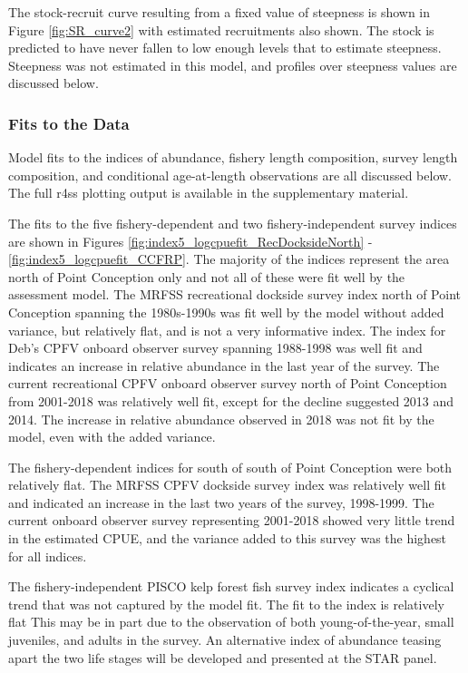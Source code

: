 \documentclass[12pt,]{article}
\begin{document}
The stock-recruit curve resulting from a fixed value of steepness is
shown in Figure \ref{fig:SR_curve2} with estimated recruitments also
shown. The stock is predicted to have never fallen to low enough levels
that to estimate steepness. Steepness was not estimated in this model,
and profiles over steepness values are discussed below.

\subsubsection{Fits to the Data}\label{fits-to-the-data}

Model fits to the indices of abundance, fishery length composition,
survey length composition, and conditional age-at-length observations
are all discussed below. The full r4ss plotting output is available in
the supplementary material.

The fits to the five fishery-dependent and two fishery-independent
survey indices are shown in Figures
\ref{fig:index5_logcpuefit_RecDocksideNorth} -
\ref{fig:index5_logcpuefit_CCFRP}. The majority of the indices represent
the area north of Point Conception only and not all of these were fit
well by the assessment model. The MRFSS recreational dockside survey
index north of Point Conception spanning the 1980s-1990s was fit well by
the model without added variance, but relatively flat, and is not a very
informative index. The index for Deb's CPFV onboard observer survey
spanning 1988-1998 was well fit and indicates an increase in relative
abundance in the last year of the survey. The current recreational CPFV
onboard observer survey north of Point Conception from 2001-2018 was
relatively well fit, except for the decline suggested 2013 and 2014. The
increase in relative abundance observed in 2018 was not fit by the
model, even with the added variance.

The fishery-dependent indices for south of south of Point Conception
were both relatively flat. The MRFSS CPFV dockside survey index was
relatively well fit and indicated an increase in the last two years of
the survey, 1998-1999. The current onboard observer survey representing
2001-2018 showed very little trend in the estimated CPUE, and the
variance added to this survey was the highest for all indices.

The fishery-independent PISCO kelp forest fish survey index indicates a
cyclical trend that was not captured by the model fit. The fit to the
index is relatively flat This may be in part due to the observation of
both young-of-the-year, small juveniles, and adults in the survey. An
alternative index of abundance teasing apart the two life stages will be
developed and presented at the STAR panel.
\end{document}
